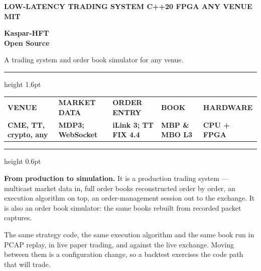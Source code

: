 \documentclass[10pt]{article}
\begin{document}
{\color{accent}\sffamily\bfseries\scriptsize
 LOW-LATENCY TRADING SYSTEM \quad\textperiodcentered\quad C++20 \quad\textperiodcentered\quad FPGA \quad\textperiodcentered\quad ANY VENUE \quad\textperiodcentered\quad MIT}

\vspace{2pt}
{\sffamily\bfseries\fontsize{40}{40}\selectfont Kaspar-HFT}\\[2pt]
{\color{ink2}\sffamily\bfseries\fontsize{19}{19}\selectfont Open Source}

\vspace{4pt}
{\color{ink2}\sffamily\large A trading system and order book simulator for any venue.}

\vspace{7pt}
{\color{ink}\hrule height 1.6pt}
\vspace{5pt}

\noindent\begin{tabularx}{\textwidth}{@{}XXXXX@{}}
{\color{ink3}\sffamily\bfseries\scriptsize VENUE} &
{\color{ink3}\sffamily\bfseries\scriptsize MARKET DATA} &
{\color{ink3}\sffamily\bfseries\scriptsize ORDER ENTRY} &
{\color{ink3}\sffamily\bfseries\scriptsize BOOK} &
{\color{ink3}\sffamily\bfseries\scriptsize HARDWARE} \\[-4pt]
\sffamily\bfseries\small CME, TT, crypto, any &
\sffamily\bfseries\small MDP3; WebSocket &
\sffamily\bfseries\small iLink 3; TT FIX 4.4 &
\sffamily\bfseries\small MBP \& MBO L3 &
\sffamily\bfseries\small CPU + FPGA \\
\end{tabularx}

\vspace{2pt}
{\color{rulec}\hrule height 0.6pt}

\vspace{8pt}
\textbf{From production to simulation.} It is a production trading
system --- multicast market data in, full order books reconstructed order by
order, an execution algorithm on top, an order-management session out to
the exchange. It is also an order book simulator: the same books rebuilt from recorded
packet captures.

The same strategy code, the same execution algorithm
and the same book run in PCAP replay, in live paper trading, and against the live
exchange. Moving between them is a configuration change, so a backtest
exercises the code path that will trade.
\end{document}
